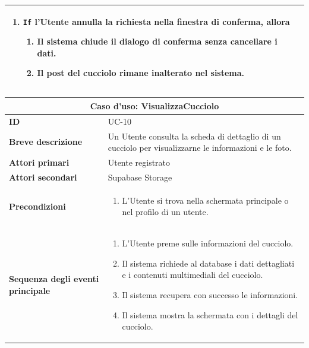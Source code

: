 \documentclass[a4paper]{report}
\begin{document}
\begin{table}[H]
\begin{tabular}{|p{3.9cm}|p{9.9cm}|}
\begin{enumerate}[leftmargin=14pt,label=\arabic*.,labelsep=0.5em,topsep=0pt,partopsep=0pt,parsep=0pt,itemsep=0pt]
  \item \texttt{If} l'Utente annulla la richiesta nella finestra di conferma, allora
  \begin{enumerate}[label=\arabic{enumi}.\arabic*.,leftmargin=22pt,labelsep=0.5em,topsep=0pt,partopsep=0pt,parsep=0pt,itemsep=0pt]
      \item Il sistema chiude il dialogo di conferma senza cancellare i dati.
      \item Il post del cucciolo rimane inalterato nel sistema.
  \end{enumerate}
\end{enumerate}\\ \hline
\end{tabular}
\end{table}

\begin{table}[H]
\vspace*{-0cm}
\renewcommand{\arraystretch}{1.9}
\begin{tabular}{|p{3.9cm}|p{9.9cm}|}
\hline
\multicolumn{2}{|c|}{\textbf{Caso d’uso: VisualizzaCucciolo}} \\ \hline
\textbf{ID} & UC-10 \\ \hline
\textbf{Breve descrizione} & Un Utente consulta la scheda di dettaglio di un cucciolo per visualizzarne le informazioni e le foto. \\ \hline
\textbf{Attori primari} & Utente registrato\\ \hline
\textbf{Attori secondari} & Supabase Storage \\ \hline
\textbf{Precondizioni} & \begin{enumerate}[leftmargin=14pt,label=\arabic*.,labelsep=0.5em,topsep=0pt,partopsep=0pt,parsep=0pt,itemsep=0pt]
   \item L'Utente si trova nella schermata principale o nel profilo di un utente.
\end{enumerate} \\ \hline
\textbf{Sequenza degli eventi principale} &
\begin{enumerate}[leftmargin=14pt,label=\arabic*.,labelsep=0.5em,topsep=0pt,partopsep=0pt,parsep=0pt,itemsep=0pt]
  \item L'Utente preme sulle informazioni del cucciolo.
  \item Il sistema richiede al database i dati dettagliati e i contenuti multimediali del cucciolo.
  \item Il sistema recupera con successo le informazioni.
  \item Il sistema mostra la schermata con i dettagli del cucciolo.

\end{enumerate}
\end{tabular}
\end{table}
\end{document}
